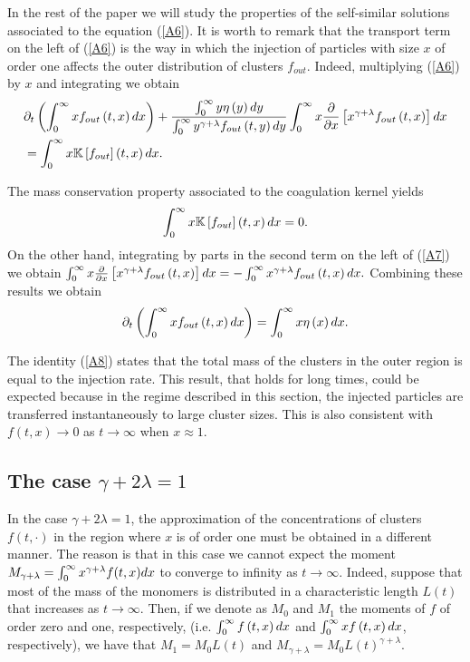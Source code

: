 \documentclass[11pt]{article}
\numberwithin{equation}{section}
\theoremstyle{plain}
\newcommand{\der}{\textup{d}}
\begin{document}
In the rest of the paper we will study the properties of the self-similar
solutions associated to the equation (\ref{A6}). It is worth to remark that
the transport term on the left of (\ref{A6}) is the way in which the injection of
particles with size $x$ of order one affects the outer distribution of
clusters $f_{out}$. Indeed, multiplying (\ref{A6}) by $x$ and integrating we
obtain%
\begin{align} 
& \partial_{t}\left(  \int_{0}^{\infty}xf_{out}\left(  t,x\right)  \der x\right)
+\frac{\int_{0}^{\infty}y\eta\left(  y\right)  \der y}{\int_{0}^{\infty}%
y^{\gamma+\lambda}f_{out}\left(  t,y\right)  \der y}\int_{0}^{\infty}%
x\frac{\partial}{\partial x}\left[  x^{\gamma+\lambda}f_{out}\left(
t,x\right)  \right]  \der x \nonumber \\
&=\int_{0}^{\infty}x\mathbb{K}\left[  f_{out}\right]
\left(  t,x\right)  \der x.\label{A7}%
\end{align}


The mass conservation property associated to the coagulation kernel yields
\[ \int_{0}^{\infty}x\mathbb{K}\left[  f_{out}\right]  \left(  t,x\right)
\der x=0.
\]
On the other hand, integrating by parts in the second term on the left
of (\ref{A7}) we obtain $\int_{0}^{\infty}x\frac{\partial}{\partial x}\left[
x^{\gamma+\lambda}f_{out}\left(  t,x\right)  \right]  \der x=-\int_{0}^{\infty
}x^{\gamma+\lambda}f_{out}\left(  t,x\right)  \der x.$ Combining these results we
obtain%
\begin{equation}
\partial_{t}\left(  \int_{0}^{\infty}xf_{out}\left(  t,x\right)  \der x\right)
=\int_{0}^{\infty}x\eta\left(  x\right)  \der x.\label{A8}%
\end{equation}


The identity (\ref{A8}) states that the total mass of the clusters in the
outer region is equal to the injection rate. This result, that holds for long
times, could be expected because in the regime described in this section, the
injected particles are transferred instantaneously to large cluster sizes. This is also consistent with $f(t,x)\rightarrow 0$ as $t\rightarrow\infty$ when $x\approx 1$.


\subsection{The case $\gamma+2\lambda=1$} \label{sec:asympt =1}

In the case $\gamma+2\lambda=1$, the approximation of the concentrations of clusters $f(t, \cdot)$ in
the region where $x$ is of order one must be obtained in a different manner.
The
reason is that in this case we cannot expect the moment $M_{\gamma+\lambda}=\int_0^\infty x^{\gamma +\lambda} f(t,x) \der x $
to converge to infinity as $t\rightarrow\infty.$ Indeed, suppose that most
of the mass of the monomers is distributed in a characteristic length $L(t)$
that increases as $t\rightarrow\infty.$ Then, if we denote as $M_{0}$ and
$M_{1}$ the moments of $f$ of order zero and one, respectively, (i.e. $\int
_{0}^{\infty}f\left(  t,x\right) \der x$ and $\int_{0}^{\infty}xf\left(
t,x\right)  \der x $, respectively), we have that $M_{1}=M_{0} L(t)$ and $M_{\gamma+\lambda}%
=M_{0}L(t)^{\gamma+\lambda}.$ 
\end{document}
